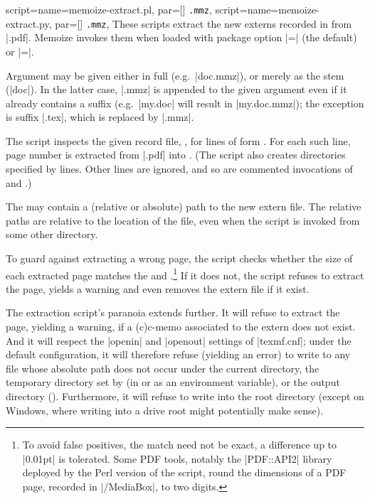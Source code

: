\documentclass[a4paper,11pt]{article}
\begin{document}
\begin{doc}{
    script={name=memoize-extract.pl, par=[] \texttt{.mmz}},
    script={name=memoize-extract.py, par=[] \texttt{.mmz}},
  }
  These scripts extract the new externs recorded in \dmmz from
  |.pdf|.  Memoize invokes them when loaded with package option
  |=| (the default) or
  |=|.

  Argument \dmmz may be given either in full (e.g.\ |doc.mmz|), or
  merely as the stem (|doc|).  In the latter case, |.mmz| is appended to the
  given argument even if it already contains a suffix (e.g.\ |my.doc| will
  result in |my.doc.mmz|); the exception is suffix |.tex|, which is replaced by
  |.mmz|.
  
  The script inspects the given record file, \dmmz, for lines of
  form .  For each such line, page number  is extracted from |.pdf| into .
  (The script also creates directories specified by  lines.
  Other lines are ignored, and so are commented invocations of
   and .)

  The  may contain a (relative or absolute) path to the
  new extern file.  The relative paths are relative to the location of the
  \dmmz file, even when the script is invoked from some other directory.

  To guard against extracting a wrong page, the script checks whether the size
  of each extracted page matches the  and .\footnote{\label{fn:tolerance}To avoid false positives, the match
    need not be exact, a difference up to |0.01pt| is tolerated.  Some PDF
    tools, notably the |PDF::API2| library deployed by the Perl version of the
    script, round the dimensions of a PDF page, recorded in |/MediaBox|, to two
    digits.}  If it does not, the script refuses to extract the page, yields a
  warning and even removes the extern file if it exist.

  The extraction script's paranoia extends further.  It will refuse to extract
  the page, yielding a warning, if a (c)c-memo associated to the extern does
  not exist.  And it will respect the |openin| and |openout| settings of
  |texmf.cnf|; under the default configuration, it will therefore refuse
  (yielding an error) to write to any file whose absolute path does not occur
  under the current directory, the temporary directory set by
   (in  or as an environment variable),
  or the output directory ().  Furthermore, it
  will refuse to write into the root directory (except on Windows, where
  writing into a drive root might potentially make sense).


\end{doc}
\end{document}
